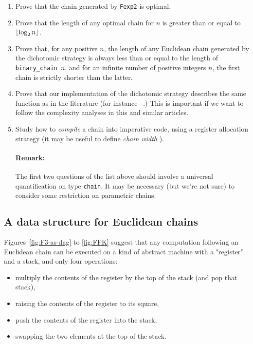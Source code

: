 \begin{project}

\vspace{3pt}

\noindent

\begin{enumerate}
\item  Prove that the chain generated by \texttt{Fexp2} is optimal.
\item Prove that  the length of any optimal chain for $n$ is
greater than or equal to $\lfloor\log_2{n}\rfloor$.
\item Prove that, for any positive $n$, the length of any Euclidean chain generated by the 
  dichotomic strategy  is always less than or equal to
  the length of \texttt{binary\_chain $n$}, and for an infinite number
of positive integers $n$, the first chain  is strictly shorter
than  the latter.
\item Prove that our implementation of the dichotomic strategy describes
 the same function as in the literature (for instance ~\cite{DBLP:journals/ita/BrlekCHM95}.)
This is important if we want to follow the complexity analyses in this and similar articles.
\item Study how to \emph{compile} a chain into imperative code, using a register allocation strategy (it may be useful  to define \emph{chain width} ).

\paragraph*{Remark:} The first two questions of the list above should involve a 
universal quantification on type
\texttt{chain}. It may be necessary (but we're not sure) to consider  some 
restriction on parametric chains.

\end{enumerate}
\end{project}

\subsection{A data structure for Euclidean chains}


Figures~\vref{fig:F3-as-dag} to \vref{fig:FFK} suggest that any computation following an Euclidean chain can be executed on a kind  of abstract machine with a "register'' and a stack, and only four operations:
\begin{itemize}
\item multiply the contents of the register by the top of the stack (and pop that stack),
\item raising the contents of the register to its square,
\item push the contents of the register into the stack,
\item swapping the two elements at the top of the stack.
\end{itemize}


